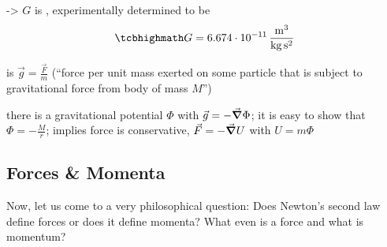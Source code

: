 \documentclass[../class_mech_main.tex]{subfiles}
\begin{document}

-> $G$ is , experimentally determined to be
\begin{equation}
	\eqbox{
		G = 6.674 \cdot 10^{-11} \, \frac{\mathrm{m}^3}{\mathrm{kg} \, \mathrm{s}^2}
	}
\end{equation}


 is $\vec{g} = \frac{\vec{F}}{m}$ (\enquote{force per unit mass exerted on some particle that is subject to gravitational force from body of mass $M$})

there is a gravitational potential $\Phi$ with $\vec{g} = - \grad \Phi$; it is easy to show that $\Phi = - \frac{M}{r}$; implies force is conservative, $\vec{F} = - \grad U$ with $U = m \Phi$



        \subsection{Forces \& Momenta}
		\label{sec:forces_and_momenta}
% 
% 




Now, let us come to a very philosophical question: Does Newton's second law define forces or does it define momenta? What even is a force and what is momentum?
\end{document}
